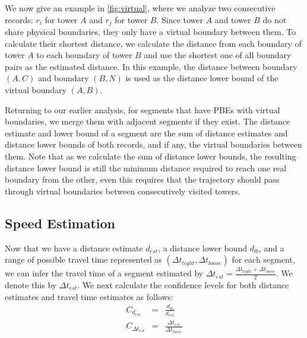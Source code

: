We now give an example in \autoref{fig:virtual}, where we analyze two consecutive records: $r_i$ for tower $A$ and $r_j$ for tower $B$. Since tower $A$ and tower $B$ do not share physical boundaries, they only have a virtual boundary between them. To calculate their shortest distance, we calculate the distance from each boundary of tower $A$ to each boundary of tower $B$ and use the shortest one of all boundary pairs as the estimated distance. In this example, the distance between boundary $(A, C)$ and boundary $(B, N)$ is used as the distance lower bound of the virtual boundary $(A, B)$.


Returning to our earlier analysis, for segments that have PBEs with virtual boundaries, we merge them with adjacent segments if they exist. The distance estimate and lower bound of a segment are the sum of distance estimates and distance lower bounds of both records, and if any, the virtual boundaries between them. Note that as we calculate the sum of distance lower bounds, the resulting distance lower bound is still the minimum distance required to reach one real boundary from the other, even this requires that the trajectory should pass through virtual boundaries  between consecutively visited towers.

\subsection{Speed Estimation}

Now that we have a distance estimate $d_{est}$, a distance lower bound $d_{lb}$, and a range of possible travel time represented as $(\Delta t_{tight}, \Delta t_{loose})$ for each segment, we can infer the travel time of a segment estimated by $\Delta t_{est} = \frac{\Delta t_{tight} + \Delta t_{loose}}{2}$. We denote this by $\Delta t_{est}$. We next calculate the confidence levels for both distance estimates and travel time estimates as follows:
\begin{eqnarray}
  C_{d_{est}} &=& \frac{d_{lb}}{d_{est}} \\
  C_{\Delta t_{est}} &=& \frac{\Delta t_{est}}{\Delta t_{loose}}
\end{eqnarray}

